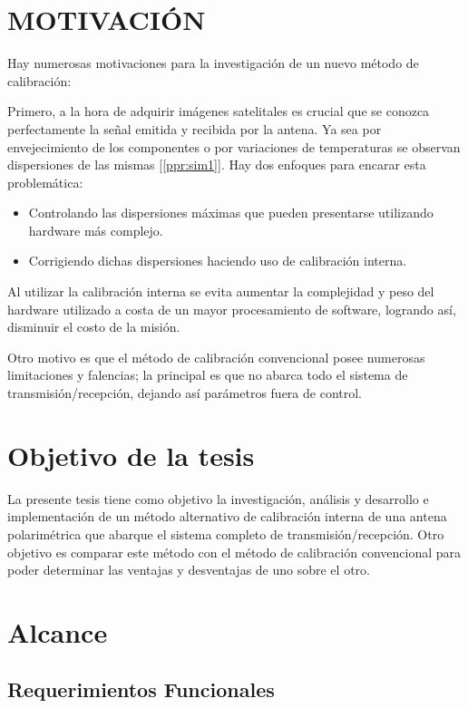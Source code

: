 \documentclass[a4paper,10pt]{article}
\begin{document}
	\section{MOTIVACIÓN}
		Hay numerosas motivaciones para la investigación de un nuevo método de 
	calibración:

		Primero, a la hora de adquirir imágenes satelitales es crucial que se 
	conozca perfectamente la señal emitida y recibida por la antena. Ya sea por 
	envejecimiento de los componentes o por variaciones de temperaturas se
    observan dispersiones de las mismas [\ref{ppr:sim1}]. Hay dos enfoques para
    encarar esta problemática:

		\begin{itemize}
			\item Controlando las dispersiones máximas que pueden presentarse 
			utilizando hardware más complejo.

			\item Corrigiendo dichas dispersiones haciendo uso de calibración 
			interna.
		\end{itemize}

		Al utilizar la calibración interna se evita aumentar la complejidad y 
	peso del hardware utilizado a costa de un mayor procesamiento de software, 
	logrando así, disminuir el costo de la misión.
		
		Otro motivo es que el método de calibración convencional posee numerosas
	limitaciones y falencias; la principal es que no abarca todo el sistema de 
	transmisión/recepción, dejando así parámetros fuera de control. 

		
	\section{Objetivo de la tesis}
    
    La presente tesis tiene como objetivo la investigación, análisis y 
desarrollo e implementación de un método alternativo de calibración interna de 
una antena polarimétrica que abarque el sistema completo de 
transmisión/recepción. Otro objetivo es comparar este método con el método de 
calibración convencional para poder determinar las ventajas y desventajas de uno
sobre el otro.

\section{Alcance}

\subsection{Requerimientos Funcionales}
\end{document}
